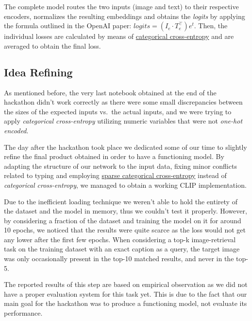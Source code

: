 \documentclass[12pt, a4paper]{article}
\begin{document}
The complete model routes the two inputs (image and text) to their respective encoders, normalizes the resulting embeddings and obtains the \textit{logits} by applying the formula outlined in the OpenAI paper: $logits = (I_e \cdot T_e^{\top})e^t$.
Then, the individual losses are calculated by means of \href{https://www.tensorflow.org/api_docs/python/tf/keras/losses/CategoricalCrossentropy}{categorical cross-entropy} and are averaged to obtain the final loss.

\subsection{Idea Refining}
As mentioned before, the very last notebook obtained at the end of the hackathon didn't work correctly as there were some small discrepancies between the sizes of the expected inputs vs.\ the actual inputs, and we were trying to apply \textit{categorical cross-entropy} utilizing numeric variables that were not \textit{one-hot encoded}.

The day after the hackathon took place we dedicated some of our time to slightly refine the final product obtained in order to have a functioning model.
By adapting the structure of our network to the input data, fixing minor conflicts related to typing and employing \href{https://www.tensorflow.org/api_docs/python/tf/keras/losses/SparseCategoricalCrossentropy}{sparse categorical cross-entropy} instead of \textit{categorical cross-entropy}, we managed to obtain a working CLIP implementation.

Due to the inefficient loading technique we weren't able to hold the entirety of the dataset and the model in memory, thus we couldn't test it properly.
However, by considering a fraction of the dataset and training the model on it for around 10 epochs, we noticed that the results were quite scarce as the loss would not get any lower after the first few epochs.
When considering a top-k image-retrieval task on the training dataset with an exact caption as a query, the target image was only occasionally present in the top-10 matched results, and never in the top-5.

\begin{spacing}{1.25}
    \tiny
    The reported results of this step are based on empirical observation as we did not have a proper evaluation system for this task yet.
    This is due to the fact that our main goal for the hackathon was to produce a functioning model, not evaluate its performance.
\end{spacing}
\end{document}

